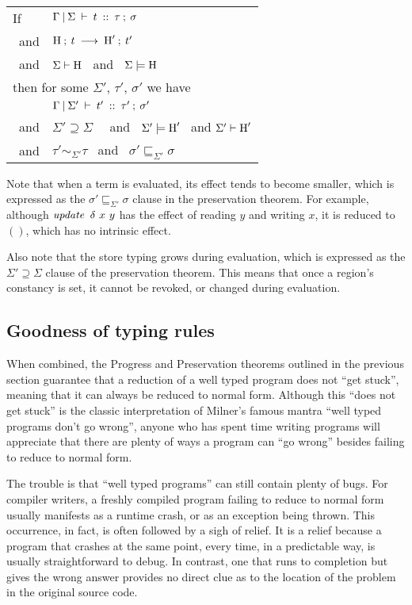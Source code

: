 \medskip
\begin{tabular}{ll}
	If	& $\Gamma \: \arrowvert \: \Sigma \: \vdash \: t \: :: \: \tau \: ; \: \sigma$ \\
	\ and	& $\textrm{H} \: ; \: t \: \longrightarrow \: \textrm{H}' \: ; \: t'$ \\
	\ and	& $\Sigma \vdash \textrm{H}$ \ and \ $\Sigma \models \textrm{H}$ 
	\\[1ex]
	\multicolumn{2}{l}{then for some $\Sigma'$, $\tau'$, $\sigma'$ we have} \\
		& $\Gamma \: \arrowvert \: \Sigma' \: \vdash \: t' \: :: \: \tau' \: ; \: \sigma'$ \\
	\ and	& $\Sigma' \supseteq \Sigma$ \ \ and \ $\Sigma' \models \textrm{H}'$ \ and $\Sigma' \vdash  \textrm{H}'$  \\
	\ and	& $\tau' \sim_{\Sigma'} \tau$ \  and \ $\sigma' \sqsubseteq_{\Sigma'} \sigma$ 
\end{tabular}

\bigskip
Note that when a term is evaluated, its effect tends to become smaller, which is expressed as the $\sigma' \sqsubseteq_{\Sigma'} \sigma$ clause in the preservation theorem. For example, although $\operatorname{\mathit{update}} \ \delta \ x \ y$ has the effect of reading $y$ and writing $x$, it is reduced to $()$, which has no intrinsic effect.

Also note that the store typing grows during evaluation, which is expressed as the $\Sigma' \supseteq \Sigma$ clause of the preservation theorem. This means that once a region's constancy is set, it cannot be revoked, or changed during evaluation.


\clearpage{}
\subsection{Goodness of typing rules}
When combined, the Progress and Preservation theorems outlined in the previous section guarantee that a reduction of a well typed program does not ``get stuck'', meaning that it can always be reduced to normal form. Although this ``does not get stuck'' is the classic interpretation of Milner's famous mantra ``well typed programs don't go wrong'', anyone who has spent time writing programs will appreciate that there are plenty of ways a program can ``go wrong'' besides failing to reduce to normal form.

The trouble is that ``well typed programs'' can still contain plenty of bugs. For compiler writers, a freshly compiled program failing to reduce to normal form usually manifests as a runtime crash, or as an exception being thrown. This occurrence, in fact, is often followed by a sigh of relief. It is a relief because a program that crashes at the same point, every time, in a predictable way, is usually straightforward to debug. In contrast, one that runs to completion but gives the wrong answer provides no direct clue as to the location of the problem in the original source code.


